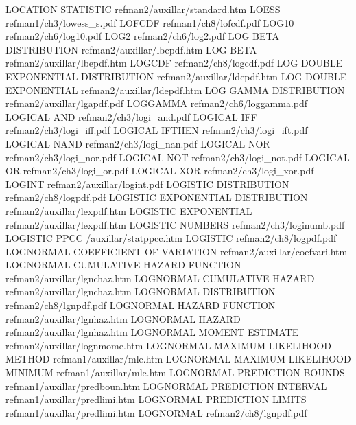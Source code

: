 LOCATION STATISTIC                      refman2/auxillar/standard.htm
LOESS                                   refman1/ch3/lowess_s.pdf
LOFCDF                                  refman1/ch8/lofcdf.pdf
LOG10                                   refman2/ch6/log10.pdf
LOG2                                    refman2/ch6/log2.pdf
LOG BETA DISTRIBUTION                   refman2/auxillar/lbepdf.htm
LOG BETA                                refman2/auxillar/lbepdf.htm
LOGCDF                                  refman2/ch8/logcdf.pdf
LOG DOUBLE EXPONENTIAL DISTRIBUTION     refman2/auxillar/ldepdf.htm
LOG DOUBLE EXPONENTIAL                  refman2/auxillar/ldepdf.htm
LOG GAMMA DISTRIBUTION                  refman2/auxillar/lgapdf.pdf
LOGGAMMA                                refman2/ch6/loggamma.pdf
LOGICAL AND                             refman2/ch3/logi_and.pdf
LOGICAL IFF                             refman2/ch3/logi_iff.pdf
LOGICAL IFTHEN                          refman2/ch3/logi_ift.pdf
LOGICAL NAND                            refman2/ch3/logi_nan.pdf
LOGICAL NOR                             refman2/ch3/logi_nor.pdf
LOGICAL NOT                             refman2/ch3/logi_not.pdf
LOGICAL OR                              refman2/ch3/logi_or.pdf
LOGICAL XOR                             refman2/ch3/logi_xor.pdf
LOGINT                                  refman2/auxillar/logint.pdf
LOGISTIC DISTRIBUTION                   refman2/ch8/logpdf.pdf
LOGISTIC EXPONENTIAL DISTRIBUTION       refman2/auxillar/lexpdf.htm
LOGISTIC EXPONENTIAL                    refman2/auxillar/lexpdf.htm
LOGISTIC NUMBERS                        refman2/ch3/loginumb.pdf
LOGISTIC PPCC                           /auxillar/statppcc.htm
LOGISTIC                                refman2/ch8/logpdf.pdf
LOGNORMAL COEFFICIENT OF VARIATION      refman2/auxillar/coefvari.htm
LOGNORMAL CUMULATIVE HAZARD FUNCTION    refman2/auxillar/lgnchaz.htm
LOGNORMAL CUMULATIVE HAZARD             refman2/auxillar/lgnchaz.htm
LOGNORMAL DISTRIBUTION                  refman2/ch8/lgnpdf.pdf
LOGNORMAL HAZARD FUNCTION               refman2/auxillar/lgnhaz.htm
LOGNORMAL HAZARD                        refman2/auxillar/lgnhaz.htm
LOGNORMAL MOMENT ESTIMATE               refman2/auxillar/lognmome.htm
LOGNORMAL MAXIMUM LIKELIHOOD METHOD     refman1/auxillar/mle.htm
LOGNORMAL MAXIMUM LIKELIHOOD MINIMUM    refman1/auxillar/mle.htm
LOGNORMAL PREDICTION BOUNDS             refman1/auxillar/predboun.htm
LOGNORMAL PREDICTION INTERVAL           refman1/auxillar/predlimi.htm
LOGNORMAL PREDICTION LIMITS             refman1/auxillar/predlimi.htm
LOGNORMAL                               refman2/ch8/lgnpdf.pdf
